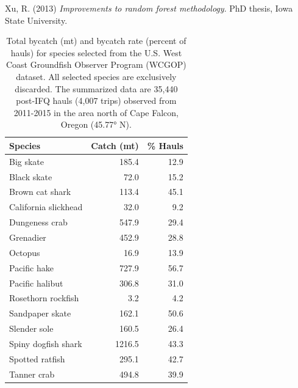 \documentclass[]{article}
\begin{document}
\leavevmode\hypertarget{ref-xu2013}{}%
Xu, R. (2013) \emph{Improvements to random forest methodology}.
PhD thesis, Iowa State University.

\pagebreak

\begin{table}[t]

\caption{\label{tab:species-list}\label{tab:species-list}Total bycatch (mt) and bycatch rate (percent of hauls) for species selected from the U.S. West Coast Groundfish Observer Program (WCGOP) dataset. All selected species are exclusively discarded. The summarized data are 35,440 post-IFQ hauls (4,007 trips) observed from 2011-2015 in the area north of Cape Falcon, Oregon (45.77° N).}
\centering
\begin{tabular}{lrr}
\toprule
Species & Catch (mt) & \% Hauls\\
\midrule
Big skate & 185.4 & 12.9\\
Black skate & 72.0 & 15.2\\
Brown cat shark & 113.4 & 45.1\\
California slickhead & 32.0 & 9.2\\
Dungeness crab & 547.9 & 29.4\\
\addlinespace
Grenadier & 452.9 & 28.8\\
Octopus & 16.9 & 13.9\\
Pacific hake & 727.9 & 56.7\\
Pacific halibut & 306.8 & 31.0\\
Rosethorn rockfish & 3.2 & 4.2\\
\addlinespace
Sandpaper skate & 162.1 & 50.6\\
Slender sole & 160.5 & 26.4\\
Spiny dogfish shark & 1216.5 & 43.3\\
Spotted ratfish & 295.1 & 42.7\\
Tanner crab & 494.8 & 39.9\\
\bottomrule
\end{tabular}
\end{table}

\pagebreak
\end{document}
